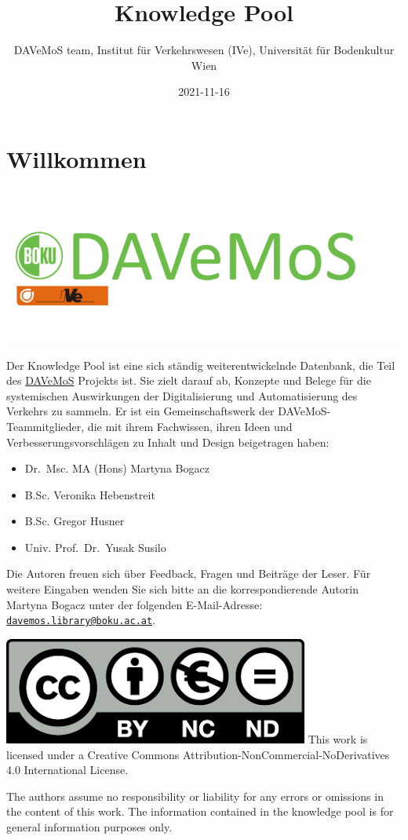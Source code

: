 \documentclass[
]{book}
\title{Knowledge Pool}
\author{DAVeMoS team, Institut für Verkehrswesen (IVe), Universität für Bodenkultur Wien}
\date{2021-11-16}
\providecommand{\tightlist}{%
  \setlength{\itemsep}{0pt}\setlength{\parskip}{0pt}}
\begin{document}
\maketitle

{
\setcounter{tocdepth}{1}
\tableofcontents
}
\hypertarget{willkommen}{%
\chapter*{Willkommen}\label{willkommen}}

\includegraphics[width=0.4\linewidth]{image/davemos_logo}

Der Knowledge Pool ist eine sich ständig weiterentwickelnde Datenbank, die Teil des \href{https://www.davemos.online/}{DAVeMoS} Projekts ist. Sie zielt darauf ab, Konzepte und Belege für die systemischen Auswirkungen der Digitalisierung und Automatisierung des Verkehrs zu sammeln. Er ist ein Gemeinschaftswerk der DAVeMoS-Teammitglieder, die mit ihrem Fachwissen, ihren Ideen und Verbesserungsvorschlägen zu Inhalt und Design beigetragen haben:

\begin{itemize}
\tightlist
\item
  Dr.~Msc. MA (Hons) Martyna Bogacz
\item
  B.Sc. Veronika Hebenstreit
\item
  B.Sc. Gregor Husner
\item
  Univ. Prof.~Dr.~Yusak Susilo
\end{itemize}

Die Autoren freuen sich über Feedback, Fragen und Beiträge der Leser. Für weitere Eingaben wenden Sie sich bitte an die korrespondierende Autorin Martyna Bogacz unter der folgenden E-Mail-Adresse: \href{mailto:davemos.library@boku.ac.at}{\nolinkurl{davemos.library@boku.ac.at}}.

\includegraphics[width=0.1\linewidth]{image/cc}
This work is licensed under a Creative Commons Attribution-NonCommercial-NoDerivatives 4.0 International License.

The authors assume no responsibility or liability for any errors or omissions in the content of this work. The information contained in the knowledge pool is for general information purposes only.
\end{document}
